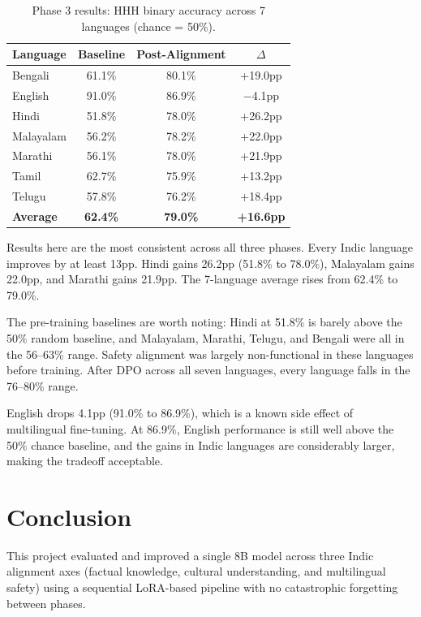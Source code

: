 \documentclass[12pt,a4paper]{article}
\begin{document}
\begin{table}[h]
\centering
\caption{Phase 3 results: HHH binary accuracy across 7 languages (chance = 50\%).}
\begin{tabular}{lccc}
\toprule
\textbf{Language} & \textbf{Baseline} & \textbf{Post-Alignment} & \textbf{$\Delta$} \\
\midrule
Bengali   & 61.1\% & 80.1\% & +19.0pp \\
English   & 91.0\% & 86.9\% & $-$4.1pp \\
Hindi     & 51.8\% & 78.0\% & +26.2pp \\
Malayalam & 56.2\% & 78.2\% & +22.0pp \\
Marathi   & 56.1\% & 78.0\% & +21.9pp \\
Tamil     & 62.7\% & 75.9\% & +13.2pp \\
Telugu    & 57.8\% & 76.2\% & +18.4pp \\
\midrule
\rowcolor{rowbold}
\textbf{Average} & \textbf{62.4\%} & \textbf{79.0\%} & \textbf{+16.6pp} \\
\bottomrule
\end{tabular}
\end{table}

Results here are the most consistent across all three phases. Every Indic language improves by at least 13pp. Hindi gains 26.2pp (51.8\% to 78.0\%), Malayalam gains 22.0pp, and Marathi gains 21.9pp. The 7-language average rises from 62.4\% to 79.0\%.

The pre-training baselines are worth noting: Hindi at 51.8\% is barely above the 50\% random baseline, and Malayalam, Marathi, Telugu, and Bengali were all in the 56--63\% range. Safety alignment was largely non-functional in these languages before training. After DPO across all seven languages, every language falls in the 76--80\% range.

English drops 4.1pp (91.0\% to 86.9\%), which is a known side effect of multilingual fine-tuning. At 86.9\%, English performance is still well above the 50\% chance baseline, and the gains in Indic languages are considerably larger, making the tradeoff acceptable.

\section{Conclusion}

This project evaluated and improved a single 8B model across three Indic alignment axes (factual knowledge, cultural understanding, and multilingual safety) using a sequential LoRA-based pipeline with no catastrophic forgetting between phases.
\end{document}
